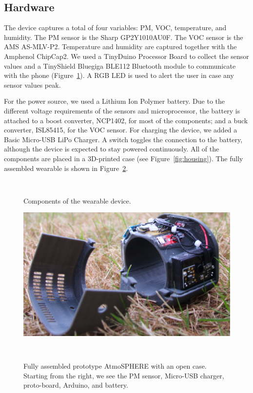 \documentclass{sigchi}
\begin{document}
\subsection{Hardware}
The device captures a total of four variables: PM, VOC, temperature, and humidity.
The PM sensor is the Sharp GP2Y1010AU0F.
The VOC sensor is the AMS AS-MLV-P2.
Temperature and humidity are captured together with the Amphenol ChipCap2.
We used a TinyDuino Processor Board to collect the sensor values and a TinyShield Bluegiga BLE112 Bluetooth module to communicate with the phone (Figure~\ref{fig:hardware block}).
A RGB LED is used to alert the user in case any sensor values peak.

For the power source, we used a Lithium Ion Polymer battery.
Due to the different voltage requirements of the sensors and microprocessor, the battery is attached to a boost converter, NCP1402, for most of the components; and a buck converter, ISL85415, for the VOC sensor.
For charging the device, we added a Basic Micro-USB LiPo Charger.
A switch toggles the connection to the battery, although the device is expected to stay powered continuously.
All of the components are placed in a 3D-printed case (see Figure~\ref{fig:housing}).
The fully assembled wearable is shown in Figure~\ref{fig:device open}.
\begin{figure}
    \centering
    
    \caption{Components of the wearable device.}
    ~\label{fig:hardware block}
\end{figure}
\begin{figure}
    \centering
    \includegraphics[width=0.9\columnwidth]{figures/Device-Open.jpg}
    \caption{Fully assembled prototype AtmoSPHERE with an open case.
        Starting from the right, we see the PM sensor, Micro-USB charger, proto-board, Arduino, and battery.}
    ~\label{fig:device open}
\end{figure}
\end{document}
